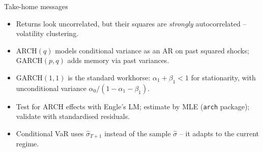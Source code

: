 \documentclass[aspectratio=169]{beamer}
\begin{document}
\begin{frame}{Take-home messages}
  \begin{itemize}
    \item Returns look uncorrelated, but their squares are
          \emph{strongly} autocorrelated -- volatility clustering.
    \item ARCH$(q)$ models conditional variance as an AR on past
          squared shocks; GARCH$(p, q)$ adds memory via past
          variances.
    \item GARCH$(1, 1)$ is the standard workhorse:
          $\alpha_1 + \beta_1 < 1$ for stationarity, with
          unconditional variance $\alpha_0 / (1 - \alpha_1 - \beta_1)$.
    \item Test for ARCH effects with Engle's LM; estimate by MLE
          (\texttt{arch} package); validate with standardised
          residuals.
    \item Conditional VaR uses $\widehat\sigma_{T+1}$ instead of
          the sample $\widehat\sigma$ -- it adapts to the current
          regime.
  \end{itemize}
\end{frame}
\end{document}
